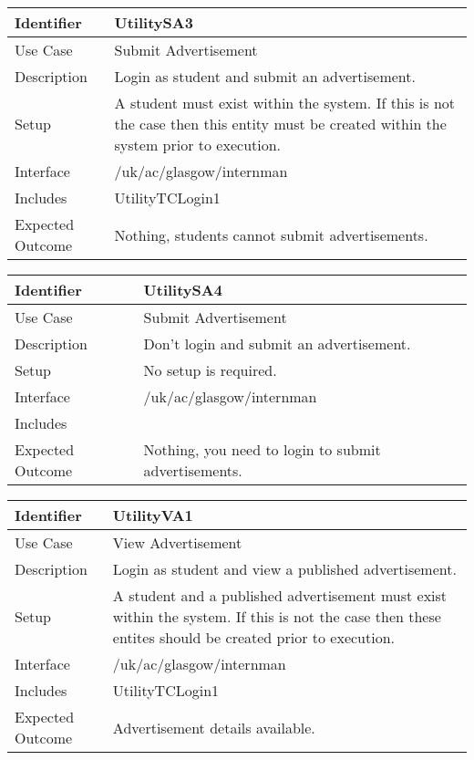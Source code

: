 \vspace{2em}

\begin{tabularx}{\textwidth}{|T|L|}
\hline
Identifier & UtilitySA3\\
\hline
Use Case & Submit Advertisement \\
\hline
Description & Login as student and submit an advertisement.\\
\hline
Setup & A student must exist within the system. If this is not the
case then this entity must be created within the system prior to execution.\\
\hline
Interface & /uk/ac/glasgow/internman \\
\hline
Includes & UtilityTCLogin1 \\
\hline
Expected Outcome & Nothing, students cannot submit advertisements.\\
\hline
\end{tabularx}

\vspace{2em}

\begin{tabularx}{\textwidth}{|T|L|}
\hline
Identifier & UtilitySA4\\
\hline
Use Case & Submit Advertisement \\
\hline
Description & Don't login and submit an advertisement.\\
\hline
Setup & No setup is required. \\
\hline
Interface & /uk/ac/glasgow/internman \\
\hline
Includes & \\
\hline
Expected Outcome & Nothing, you need to login to submit advertisements.\\
\hline
\end{tabularx}

\vspace{2em}

\begin{tabularx}{\textwidth}{|T|L|}
\hline
Identifier & UtilityVA1\\
\hline
Use Case & View Advertisement \\
\hline
Description & Login as student and view a published advertisement.\\
\hline
Setup & A student and a published advertisement must exist within the
system. If this is not the case then these entites should be created
prior to execution.\\
\hline
Interface & /uk/ac/glasgow/internman \\
\hline
Includes & UtilityTCLogin1 \\
\hline
Expected Outcome & Advertisement details available.\\
\hline
\end{tabularx}

